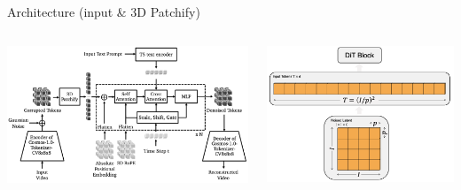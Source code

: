 \documentclass{beamer}
\begin{document}
\begin{frame}[t]{Architecture (input \& 3D Patchify)}
    \vspace{-1.6em}
	\begin{columns}[t]
		\begin{column}{.5\textwidth}
            \begin{center}
                \includegraphics[width=1.0\textwidth]{./img/diffusion_arch.png}
            \end{center}
		\end{column}
		\begin{column}{.5\textwidth}
            \begin{center}
                \includegraphics[width=1.0\textwidth]{./img/diff_arch_patch.png}
            \end{center}
		\end{column}
	\end{columns}

\end{frame}
\end{document}
